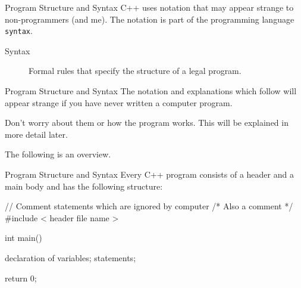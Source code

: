 \documentclass[../lecture1-introduction.tex]{subfiles}
\begin{document}

\begin{frame}[fragile]{Program Structure and Syntax}
    C++ uses notation that may appear strange to non-programmers (and me).
    The notation is part of the programming language \texttt{syntax}.
    \begin{description}
        \item [Syntax] Formal rules that specify the structure of a legal program.
    \end{description}
\end{frame}

\begin{frame}[fragile]{Program Structure and Syntax}
    The notation and explanations which follow will appear strange if you have
    never written a computer program.

    Don't worry about them or how the program works. This will be explained
    in more detail later.

    The following is an overview.
\end{frame}

\begin{frame}[fragile]{Program Structure and Syntax}
    Every C++ program consists of a header and a main body and has the following
    structure:
\begin{cppcode}[]
// Comment statements which are ignored by computer
/* Also a comment */
#include < header file name >

int main()
{
    declaration of variables;
    statements;

    return 0;
}
\end{cppcode}
\end{frame}
\end{document}
